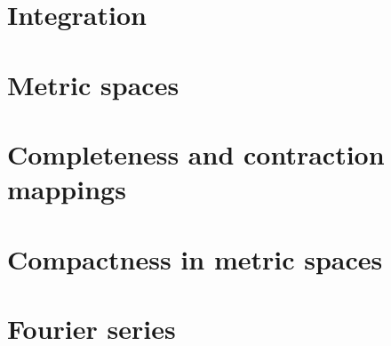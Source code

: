 \section{Integration}

\section{Metric spaces}

\section{Completeness and contraction mappings}

\section{Compactness in metric spaces}

\section{Fourier series}

